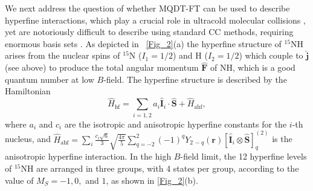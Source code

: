 \documentclass[reprint,amssymb,noeprint,twocolumn,longbibliography]{revtex4-2}
\begin{document}
We next address the question of whether MQDT-FT can be used to describe hyperfine interactions, which play a crucial role in ultracold molecular collisions \cite{Balakrishnan:16,Bause_23}, yet are notoriously difficult to describe using standard CC methods, requiring enormous basis sets \cite{Tscherbul_23}. 
As depicted in ~\cref{Fig_2}(a) the hyperfine structure of $^{15}$NH arises from the nuclear spins of $^{15}$N ($I_1=1/2$) and H ($I_2=1/2$) which couple to $\hat{\mathbf{j}}$ 
(see above) to produce the total angular momentum $\hat{\mathbf{F}}$ of NH, which is a good quantum number at low $B$-field. The hyperfine structure is described by the Hamiltonian  \cite{Bailleux_12,Bizzocchi_18,SM}
\begin{equation}
\hat{H}_\text{hf} = \sum_{i=1,2}  a_i \hat{\mathbf{I}}_i \cdot \hat{\mathbf{S}} + \hat{H}_\text{ahf}, 
\label{eq:hf}
\end{equation}
where $a_i$ and $c_i$ are the isotropic and anisotropic hyperfine  constants for the $i$-th nucleus, and $\hat{H}_\text{ahf}=\sum_i \frac{c_i\sqrt{6}}{3}\sqrt{\frac{4\pi}{5}} \sum_{q=-2}^{2} (-1)^q Y_{2\, -q}(\bm{r})  [\hat{\mathbf{I}}_i \otimes \hat{\mathbf{S}} ]_q^{(2)}$ is the anisotropic hyperfine interaction.
In the high $B$-field limit, the 12 hyperfine levels of $^{15}$NH are arranged in three groups, with 4 states per group, according to the value of $M_S = -1,0,$ and $1$, as shown in \cref{Fig_2}(b).  
\end{document}
